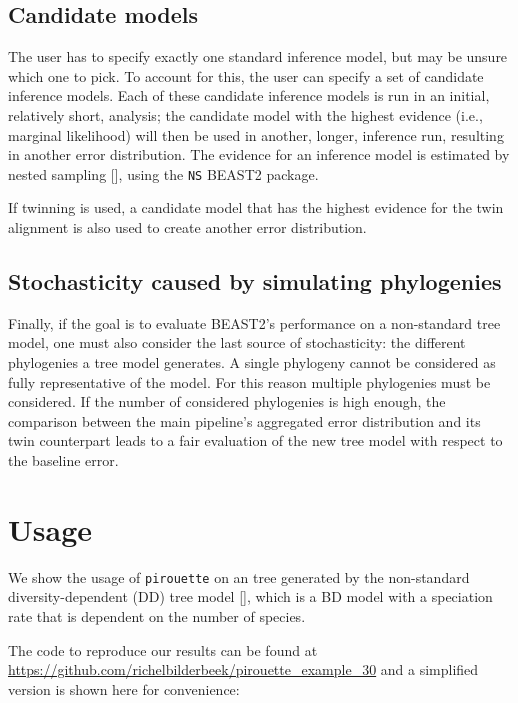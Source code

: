 \subsection{Candidate models}\label{subsec:candidates}

The user has to specify exactly one standard inference model,
but may be unsure which one to pick. To account for this, the user can
specify a set of candidate inference models. Each of these candidate inference models is run in an initial, relatively short, analysis; the candidate model with the highest 
evidence (i.e., marginal likelihood) will then be
used in another, longer, inference run, resulting in another error distribution.
The evidence for an inference model is estimated by nested 
sampling [\cite{russel2019model}], using the \verb;NS; BEAST2 package. 

If twinning is used, a candidate model that has the highest evidence for
the twin alignment is also used to create another error
distribution.

\subsection{Stochasticity caused by simulating phylogenies}

Finally, if the goal is to evaluate BEAST2's performance 
on a non-standard tree model, 
one must also consider the last source of stochasticity: 
the different phylogenies a tree model generates.
A single phylogeny cannot be considered as fully representative of the model. 
For this reason multiple phylogenies must be considered. 
If the number of considered phylogenies is high enough, 
the comparison between the main pipeline's aggregated error distribution 
and its twin counterpart leads to a fair evaluation 
of the new tree model with respect to the baseline error.

\section{Usage}

We show the usage of \verb;pirouette; on an tree generated 
by the non-standard diversity-dependent (DD) tree model [\citep{DDD, etienne2012diversity}],
which is a BD model with a speciation rate that is dependent on the number of species.

The code to reproduce our results can be found at  
\url{https://github.com/richelbilderbeek/pirouette_example_30}
and a simplified version is shown here for convenience:

